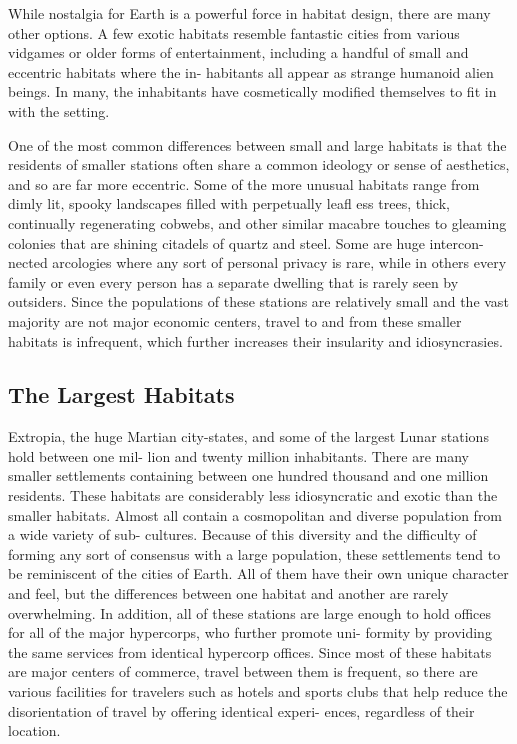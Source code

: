 While nostalgia for Earth is a powerful force in 
habitat design, there are many other options. A few 
exotic habitats resemble fantastic cities from various 
vidgames or older forms of entertainment, including a 
handful of small and eccentric habitats where the in-
habitants all appear as strange humanoid alien beings. 
In many, the inhabitants have cosmetically modified 
themselves to fit in with the setting.

One of the most common differences between small 
and large habitats is that the residents of smaller 
stations often share a common ideology or sense of 
aesthetics, and so are far more eccentric. Some of the 
more unusual habitats range from dimly lit, spooky 
landscapes filled with perpetually leafl ess trees, thick, 
continually regenerating cobwebs, and other similar 
macabre touches to gleaming colonies that are shining 
citadels of quartz and steel. Some are huge intercon-
nected arcologies where any sort of personal privacy 
is rare, while in others every family or even every 
person has a separate dwelling that is rarely seen by 
outsiders. Since the populations of these stations are 
relatively small and the vast majority are not major 
economic centers, travel to and from these smaller 
habitats is infrequent, which further increases their 
insularity and idiosyncrasies.

\subsection{The Largest Habitats}

Extropia, the huge Martian city-states, and some 
of the largest Lunar stations hold between one mil-
lion and twenty million inhabitants. There are many 
smaller settlements containing between one hundred 
thousand and one million residents. These habitats 
are considerably less idiosyncratic and exotic than the 
smaller habitats. Almost all contain a cosmopolitan 
and diverse population from a wide variety of sub-
cultures. Because of this diversity and the difficulty of 
forming any sort of consensus with a large population, 
these settlements tend to be reminiscent of the cities 
of Earth. All of them have their own unique character 
and feel, but the differences between one habitat and 
another are rarely overwhelming. In addition, all of 
these stations are large enough to hold offices for all 
of the major hypercorps, who further promote uni-
formity by providing the same services from identical 
hypercorp offices. Since most of these habitats are 
major centers of commerce, travel between them is 
frequent, so there are various facilities for travelers 
such as hotels and sports clubs that help reduce the 
disorientation of travel by offering identical experi-
ences, regardless of their location.


